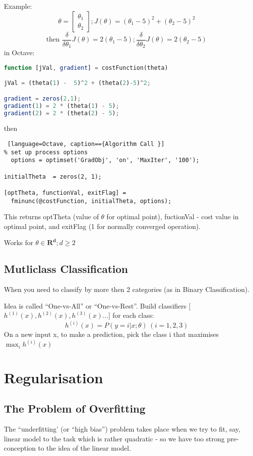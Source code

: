 \documentclass{scrartcl}
\begin{document}
Example: \[\theta = \left[ \begin{array}{c} \theta_1 \\ \theta_2
  \end{array} \right]; J(\theta) = (\theta_1 - 5)^2 + (\theta_2- 5)^2 \]
\[\textrm{then } \frac{\delta}{\delta \theta_1}J(\theta) = 2(\theta_1
-5) ;\frac{\delta}{\delta \theta_2}J(\theta) = 2(\theta_2 - 5)
\]
in Octave:
\begin{lstlisting}[language=Octave, caption=={Plugin function }]
  function [jVal, gradient] = costFunction(theta) 

jVal = (theta(1) -  5)^2 + (theta(2)-5)^2; 

gradient = zeros(2,1); 
gradient(1) = 2 * (theta(1) - 5); 
gradient(2) = 2 * (theta(2) - 5);
\end{lstlisting}
then
\begin{lstlisting} [language=Octave, caption=={Algorithm Call }]
% set up process options
  options = optimset('GradObj', 'on', 'MaxIter', '100'); 

initialTheta  = zeros(2, 1); 

[optTheta, functionVal, exitFlag] =  
  fminunc(@costFunction, initialTheta, options);
\end{lstlisting}
This returns optTheta (value of $\theta$ for optimal point),
fuctionVal - cost value in optimal point, and exitFlag (1 for normally
converged operation).

Works for $\theta \in \mathbf{R^d}; d \geq 2$

\subsection{Mutliclass Classification}
\label{sec:6-7}
When you need to classify by more then 2 categories (as in Binary
Classification).

Idea is called ``One-vs-All'' or ``One-vs-Rest''. Build classifiers
[$h^{(1)}(x), h^{(2)}(x), h^{(3)}(x)... $] for each class: \[
h^{(i)}(x) = P(y = i|x;\theta) \ (i = 1, 2, 3)
\]
On a new input x, to make a prediction, pick the class i that
maximises $\max_i h^{(i)}(x)$

\section{Regularisation}
\label{sec:7}

\subsection{The Problem of Overfitting}
\label{sec:7-1}
The ``underfitting' (or ``high bias'') problem takes place when we try
to fit, say, linear model to the task which is rather quadratic - so
we have too strong pre-conception to the idea of the linear model.
\end{document}
